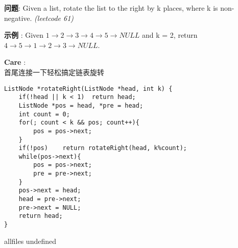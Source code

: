 \documentclass{article}
\begin{document}
\begin{CJK}{UTF8}{gbsn}     %

\else
    
\begin{description}
    \item{\textbf{问题}}: Given a list, rotate the list to the right by k places, where k is non-negative. \textit{(leetcode 61)}
    \item{\textbf{示例}} : Given $1\rightarrow2\rightarrow3\rightarrow4\rightarrow5\rightarrow NULL$ and k = 2, return $4\rightarrow5\rightarrow1\rightarrow2\rightarrow3\rightarrow NULL$.
    \item{\textbf{Care}} : 
    \\首尾连接一下轻松搞定链表旋转
    \begin{lstlisting}
ListNode *rotateRight(ListNode *head, int k) {
	if(!head || k < 1)	return head;
	ListNode *pos = head, *pre = head;
	int count = 0;
	for(; count < k && pos; count++){
		pos = pos->next;
	}
	if(!pos)	return rotateRight(head, k%count);
	while(pos->next){
		pos = pos->next;
		pre = pre->next;
	}
	pos->next = head;
	head = pre->next;
	pre->next = NULL;
	return head;
}
    \end{lstlisting}
\end{description}

\fi

\ifx allfiles undefined
\end{CJK}
\end{document}
